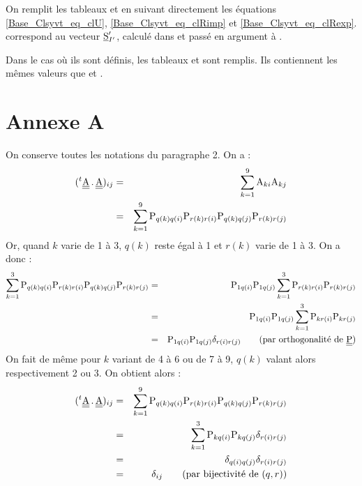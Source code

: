 On remplit les tableaux  et  en suivant directement les
\'equations \ref{Base_Clsyvt_eq_clU}, \ref{Base_Clsyvt_eq_clRimp} et \ref{Base_Clsyvt_eq_clRexp}.\\
 correspond au vecteur $\underline{\textrm{S}}_{I'}^\prime$, calcul\'e dans
 et pass\'e en argument \`a .

Dans le cas o\`u ils sont d\'efinis, les tableaux  et 
sont remplis. Ils contiennent les m\^emes valeurs que  et
.


\section{Annexe A}

On conserve toutes les notations du paragraphe 2. On a :
\begin{eqnarray}
(^t\underline{\underline{\textrm{A}}}\,.\,\underline{\underline{\textrm{A}}})_{ij}
& = & \sum_{k=1}^9\textrm{A}_{ki}\textrm{A}_{kj}\nonumber\\
& = & \sum_{k=1}^9
\textrm{P}_{q(k)q(i)}\textrm{P}_{r(k)r(i)}\textrm{P}_{q(k)q(j)}\textrm{P}_{r(k)r(j)}
\end{eqnarray}
Or, quand $k$ varie de 1 \`a 3, $q(k)$ reste \'egal \`a 1 et $r(k)$ varie de 1
\`a 3. On a donc :
\begin{eqnarray}
\sum_{k=1}^3
\textrm{P}_{q(k)q(i)}\textrm{P}_{r(k)r(i)}\textrm{P}_{q(k)q(j)}\textrm{P}_{r(k)r(j)}
&=&\textrm{P}_{1q(i)}\textrm{P}_{1q(j)}\sum_{k=1}^3
\textrm{P}_{r(k)r(i)}\textrm{P}_{r(k)r(j)}\nonumber\\
&=&\textrm{P}_{1q(i)}\textrm{P}_{1q(j)}\sum_{k=1}^3
\textrm{P}_{kr(i)}\textrm{P}_{kr(j)}\\
&=&\textrm{P}_{1q(i)}\textrm{P}_{1q(j)}\delta_{r(i)r(j)}\qquad\text{(par
orthogonalit\'e de $\underline{\underline{\textrm{P}}}$)}\nonumber
\end{eqnarray}
On fait de m\^eme pour $k$ variant de 4 \`a 6 ou de 7 \`a 9, $q(k)$ valant alors
respectivement 2 ou 3. On obtient alors :
\begin{eqnarray}
(^t\underline{\underline{\textrm{A}}}\,.\,\underline{\underline{\textrm{A}}})_{ij}
&=&
\sum_{k=1}^9
\textrm{P}_{q(k)q(i)}\textrm{P}_{r(k)r(i)}\textrm{P}_{q(k)q(j)}\textrm{P}_{r(k)r(j)}
\nonumber\\
&=&
\sum_{k=1}^3\textrm{P}_{kq(i)}\textrm{P}_{kq(j)}\delta_{r(i)r(j)}\\
&=&\delta_{q(i)q(j)}\delta_{r(i)r(j)}\nonumber\\
&=&\delta_{ij}\qquad
\text{(par bijectivit\'e de $(q,r)$)}\nonumber
\end{eqnarray}


